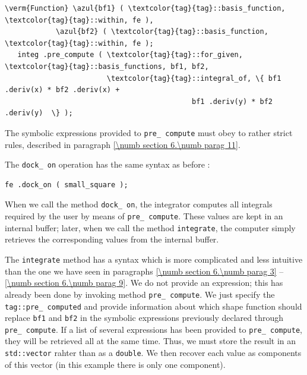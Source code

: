 \begin{Verbatim}[commandchars=\\\{\},formatcom=\small\tt,frame=single,
   label=parag-\ref{\numb section 6.\numb parag 10}.cpp,rulecolor=\color{moldura},
   baselinestretch=0.94,framesep=2mm                                            ]
   \verm{Function} \azul{bf1} ( \textcolor{tag}{tag}::basis_function, \textcolor{tag}{tag}::within, fe ),
            \azul{bf2} ( \textcolor{tag}{tag}::basis_function, \textcolor{tag}{tag}::within, fe );
   integ .pre_compute ( \textcolor{tag}{tag}::for_given, \textcolor{tag}{tag}::basis_functions, bf1, bf2,
                        \textcolor{tag}{tag}::integral_of, \{ bf1 .deriv(x) * bf2 .deriv(x) +
                                            bf1 .deriv(y) * bf2 .deriv(y)  \} );
\end{Verbatim}

The symbolic expressions provided to {\small\tt pre\_\,compute} must obey to rather strict
rules, described in paragraph \ref{\numb section 6.\numb parag 11}.

The {\small\tt dock\_\,on} operation has the same syntax as before :

\begin{Verbatim}[commandchars=\\\{\},formatcom=\small\tt,frame=single,
   label=parag-\ref{\numb section 6.\numb parag 10}.cpp,rulecolor=\color{moldura},
   baselinestretch=0.94,framesep=2mm                                            ]
      fe .dock_on ( small_square );
\end{Verbatim}

When we call the method {\small\tt dock\_\,on}, the integrator computes all integrals
required by the user by means of {\small\tt pre\_\,compute}.
These values are kept in an internal buffer; later, when we call the method
{\small\tt integrate}, the computer simply retrieves the corresponding values from
the internal buffer.

The {\small\tt integrate} method has a syntax which is more complicated and less intuitive
than the one we have seen in paragraphs \ref{\numb section 6.\numb parag 3} --
\ref{\numb section 6.\numb parag 9}.
We do not provide an expression; this has already been done by invoking method
{\small\tt pre\_\,compute}.
We just specify the {\small\tt\textcolor{tag}{tag}::pre\_\,computed} and provide
information about which shape function should replace {\small\tt bf1} and {\small\tt bf2}
in the symbolic expressions previously declared through {\small\tt pre\_\,compute}.
If a list of several expressions has been provided to {\small\tt pre\_\,compute},
they will be retrieved all at the same time.
Thus, we must store the result in an {\small\tt std::vector} rahter than as a {\small\tt double}.
We then recover each value as components of this vector (in this example there is only
one component).

